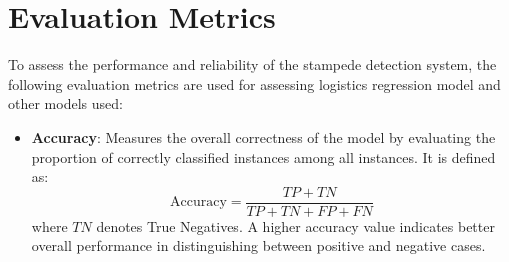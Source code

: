 \documentclass[11pt]{report}
\begin{document}
\section{Evaluation Metrics}
To assess the performance and reliability of the stampede detection system, the following evaluation metrics are used for assessing logistics regression model and other models used:

\begin{itemize}
     \item \textbf{Accuracy}: Measures the overall correctness of the model by evaluating the proportion of correctly classified instances among all instances. It is defined as:
    \begin{equation}
        \text{Accuracy} = \frac{TP + TN}{TP + TN + FP + FN}
    \end{equation}
    where $TN$ denotes True Negatives. A higher accuracy value indicates better overall performance in distinguishing between positive and negative cases.
    

\end{itemize}
\end{document}
